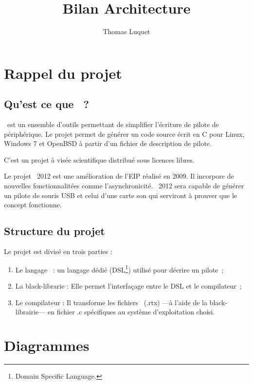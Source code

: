 \documentclass{rtxreport}
\author{Thomas Luquet}
\title{Bilan Architecture}
\begin{document}
\maketitle

\rtxmaketitleblock

\tableofcontents

\chapter{Rappel du projet}

\section{Qu'est ce que \rtx\ ?}

\rtx\ est un ensemble d'outils permettant de simplifier l'écriture de pilote de
périphérique. Le projet permet de générer un code source écrit en C pour Linux,
Windows 7 et OpenBSD à partir d'un fichier de description de pilote.

C'est un projet à visée scientifique distribué sous licences libres.

Le projet \rtx\ 2012 est une amélioration de l'EIP réalisé en 2009. Il
incorpore de nouvelles fonctionnalitées comme l’asynchronicité. \rtx\ 2012 sera
capable de générer un pilote de souris USB et celui d'une carte son qui
serviront à prouver que le concept fonctionne.

\section{Structure du projet}

Le projet est divisé en trois parties :
\begin{enumerate}
\item Le langage \rtx\ : un langage dédié (DSL\footnote{Domain Specific
Language.}) utilisé pour décrire un pilote~;
\item La black-librarie : Elle permet l'interfaçage entre le DSL et le
compilateur~;
\item Le compilateur : Il transforme les fichiers \rtx\ (.rtx) ---à l'aide
de la black-librairie--- en fichier .c spécifiques au système d'exploitation choisi.
\end{enumerate}

\chapter{Diagrammes}
\end{document}
